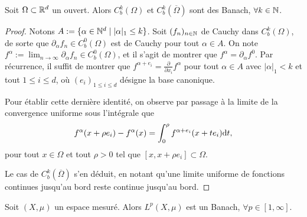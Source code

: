 \begin{exemple}
\label{ex:Ck_bornee_Banach}
	Soit $\Omega \subset \mathbb{R}^d$ un ouvert. 
	Alors $C^k_b(\Omega)$ et $C^k_b(\overline \Omega)$ sont des Banach, $\forall k \in \mathbb{N}$. 
\end{exemple}

\begin{proof}
	Notons $A := \{\alpha\in \mathbb{N}^d \mid |\alpha|_1\leq k\}$. 
	Soit $(f_n)_{n \in \mathbb{N}}$ de Cauchy dans $C^k_b(\Omega)$, de sorte que $\partial_\alpha f_n \in C^0_b(\Omega)$ est de Cauchy pour tout $\alpha \in A$.
	On note $f^\alpha := \lim_{n\to \infty} \partial_\alpha f_n \in C^0_b(\Omega)$, et il s'agit de montrer que $f^\alpha = \partial_\alpha f^0$. Par récurrence, il suffit de montrer que $f^{\alpha+e_i} = \frac{\partial}{\partial x_i} f^\alpha$ pour tout $\alpha\in A$ avec $|\alpha|_1 < k$ et tout $1 \leq i \leq d$, où $(e_i)_{1 \leq i \leq d}$ désigne la base canonique. 
	
	Pour établir cette dernière identité, on observe par passage à la limite de la convergence uniforme sous l'intégrale que 
	$$
		f^\alpha(x+\rho e_i) - f^\alpha(x) = \int_0^\rho f^{\alpha+e_i}(x+t e_i) \mathrm{d} t,
	$$
	pour tout $x \in \Omega$ et tout $\rho>0$ tel que $[x,x+\rho e_i] \subset \Omega$.
	
	Le cas de $C^k_b(\overline \Omega)$ s'en déduit, en notant qu'une limite uniforme de fonctions continues jusqu'au bord reste continue jusqu'au bord. 
\end{proof}



\begin{exemple}
\label{ex:LpBanach}
%
	Soit $(X,\mu)$ un espace mesuré. Alors $L^p(X,\mu)$ est un Banach, $\forall p \in [1,\infty]$. 
\end{exemple}

